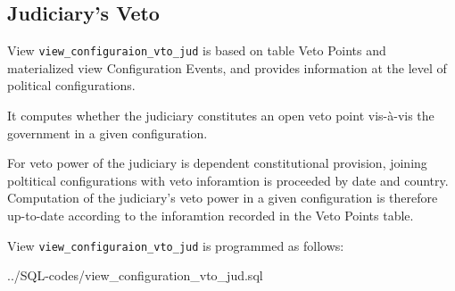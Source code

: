 \subsection{Judiciary's Veto}\label{view_configuration_vto_jud}
View \texttt{\footnotesize view\_configuraion\_vto\_jud} is based on table Veto Points and materialized view Configuration Events, and provides information at the level of political configurations.

It computes whether the judiciary constitutes an open veto point vis-\`a-vis the government in a given configuration.

For veto power of the judiciary is dependent constitutional provision,
joining poltitical configurations with veto inforamtion is proceeded by date and country. 
Computation of the judiciary's veto power in a given configuration is therefore up-to-date according to the inforamtion recorded in the Veto Points table.

View \texttt{\footnotesize view\_configuraion\_vto\_jud} is programmed as follows:

%
{../SQL-codes/view_configuration_vto_jud.sql}



